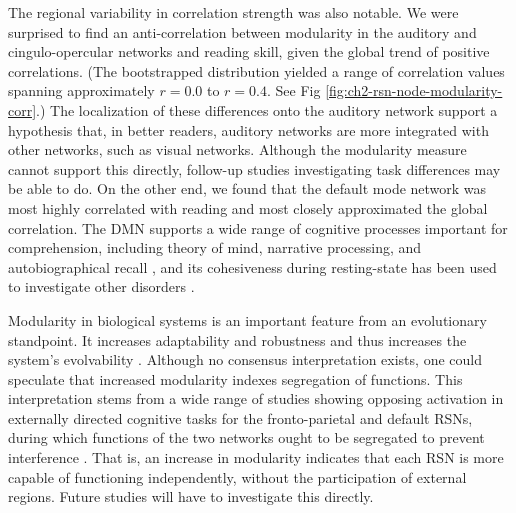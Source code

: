 The regional variability in correlation strength was also notable. We were surprised to find an anti-correlation between modularity in the auditory and cingulo-opercular networks and reading skill, given the global trend of positive correlations. (The bootstrapped distribution yielded a range of correlation values spanning approximately $r = 0.0$ to $r = 0.4$. See Fig \ref{fig:ch2-rsn-node-modularity-corr}.) The localization of these differences onto the auditory network support a hypothesis that, in better readers, auditory networks are more integrated with other networks, such as visual networks. Although the modularity measure cannot support this directly, follow-up studies investigating task differences may be able to do. On the other end, we found that the default mode network was most highly correlated with reading and most closely approximated the global correlation. The DMN supports a wide range of cognitive processes important for comprehension, including theory of mind, narrative processing, and autobiographical recall \citep{Buckner2008, AbdulSabur2014}, and its cohesiveness during resting-state has been used to investigate other disorders \citep{Uddin2008}. 

Modularity in biological systems is an important feature from an evolutionary standpoint. It increases adaptability and robustness and thus increases the system's evolvability \citep{Sporns2016}. Although no consensus interpretation exists, one could speculate that increased modularity indexes segregation of functions. This interpretation stems from a wide range of studies showing opposing activation in externally directed cognitive tasks for the fronto-parietal and default RSNs, during which functions of the two networks ought to be segregated to prevent interference \citep{Reineberg2018}. That is, an increase in modularity indicates that each RSN is more capable of functioning independently, without the participation of external regions. Future studies will have to investigate this directly.

